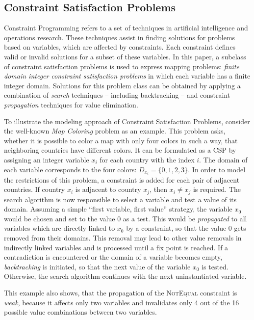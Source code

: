 \documentclass[english,biblatex]{lni}
\begin{document}
\subsection{Constraint Satisfaction Problems}
Constraint Programming refers to a set of techniques in artificial intelligence and operations research.
These techniques assist in finding solutions for problems based on variables, which are affected by constraints.
Each constraint defines valid or invalid solutions for a subset of these variables.
In this paper, a subclass of constraint satisfaction problems is used to express mapping problems:  \emph{finite domain integer constraint satisfaction problems} in which each variable has a finite integer domain.
Solutions for this problem class can be obtained by applying a combination of \emph{search} techniques -- including backtracking -- and constraint \emph{propagation} techniques for value elimination.

To illustrate the modeling approach of Constraint Satisfaction Problems, consider the well-known \emph{Map Coloring} problem as an example.
This problem asks, whether it is possible to color a map with only four colors in such a way, that neighboring countries have different colors.
It can be formulated as a CSP by assigning an integer variable $x_i$ for each country with the index $i$.
The domain of each variable corresponds to the four colors: $D_{x_i}=\{0,1,2,3\}$.
In order to model the restrictions of this problem, a constraint is added for each pair of adjacent countries.
If country $x_i$ is adjacent to country $x_j$, then $x_i \neq x_j$ is required.
The search algorithm is now responsible to select a variable and test a value of its domain.
Assuming a simple ``first variable, first value'' strategy, the variable $x_0$ would be chosen and set to the value $0$ as a test.
This would be \emph{propagated} to all variables which are directly linked to $x_0$ by a constraint, so that the value $0$ gets removed from their domains.
This removal may lead to other value removals in indirectly linked variables and is processed until a fix point is reached.
If a contradiction is encountered or the domain of a variable becomes empty, \emph{backtracking} is initiated, so that the next value of the variable $x_0$ is tested.
Otherwise, the search algorithm continues with the next uninstantiated variable.

This example also shows, that the propagation of the \textsc{NotEqual} constraint is \emph{weak}, because it affects only two variables and invalidates only 4 out of the 16 possible value combinations between two variables.
\end{document}
